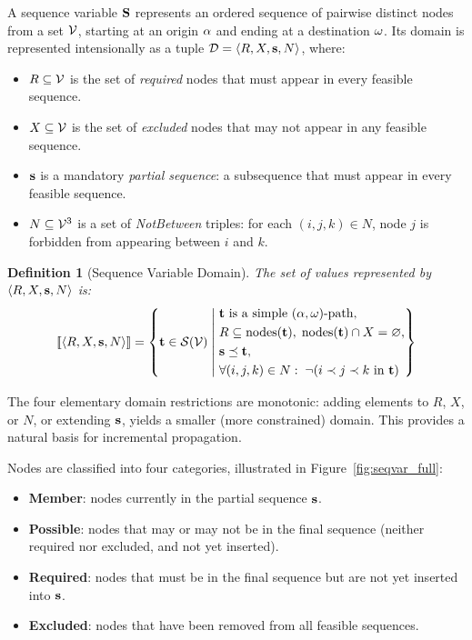 \documentclass[11pt, a4paper]{scrartcl}
\newtheorem{definition}{Definition}
\newcommand{\NB}{N}
\begin{document}
A sequence variable $\mathbf{S}$ represents an ordered sequence of pairwise distinct nodes from a set $\mathcal{V}$, starting at an origin $\alpha$ and ending at a destination $\omega$.
Its domain is represented intensionally as a tuple $\extDom = \langle R, X, \seq{s}, \NB \rangle$, where:

\begin{itemize}
    \item $R \subseteq \mathcal{V}$ is the set of \emph{required} nodes that must appear in every feasible sequence.
    \item $X \subseteq \mathcal{V}$ is the set of \emph{excluded} nodes that may not appear in any feasible sequence.
    \item $\mathbf{s}$ is a mandatory \emph{partial sequence}: a subsequence that must appear in every feasible sequence.
    \item $\NB \subseteq \nodes^3$ is a set of \emph{NotBetween} triples: for each $(i, j, k) \in \NB$, node $j$ is forbidden from appearing between $i$ and $k$.
\end{itemize}

\begin{definition}[Sequence Variable Domain]
The set of values represented by $\langle R, X, \seq{s}, \NB \rangle$ is:
\[
\llbracket \langle R, X, \seq{s}, \NB \rangle \rrbracket
=
\left\{
\seq{t} \in \mathcal{S}(\nodes)
\;\middle|\;
\begin{aligned}
& \text{$\seq{t}$ is a simple $(\first,\last)$-path}, \\
& R \subseteq \mathrm{nodes}(\seq{t}), \;
  \mathrm{nodes}(\seq{t}) \cap X = \varnothing, \\
& \seq{s} \preceq \seq{t}, \\
& \forall (i,j,k) \in \NB:\;
  \neg(i \prec j \prec k \text{ in } \seq{t})
\end{aligned}
\right\}
\]
\end{definition}

The four elementary domain restrictions are monotonic: adding elements to $R$, $X$, or $\NB$, or extending $\mathbf{s}$, yields a smaller (more constrained) domain. This provides a natural basis for incremental propagation.

Nodes are classified into four categories, illustrated in Figure~\ref{fig:seqvar_full}:

\begin{itemize}
    \item \textbf{Member}: nodes currently in the partial sequence $\mathbf{s}$.
    \item \textbf{Possible}: nodes that may or may not be in the final sequence (neither required nor excluded, and not yet inserted).
    \item \textbf{Required}: nodes that must be in the final sequence but are not yet inserted into $\mathbf{s}$.
    \item \textbf{Excluded}: nodes that have been removed from all feasible sequences.
\end{itemize}
\end{document}
